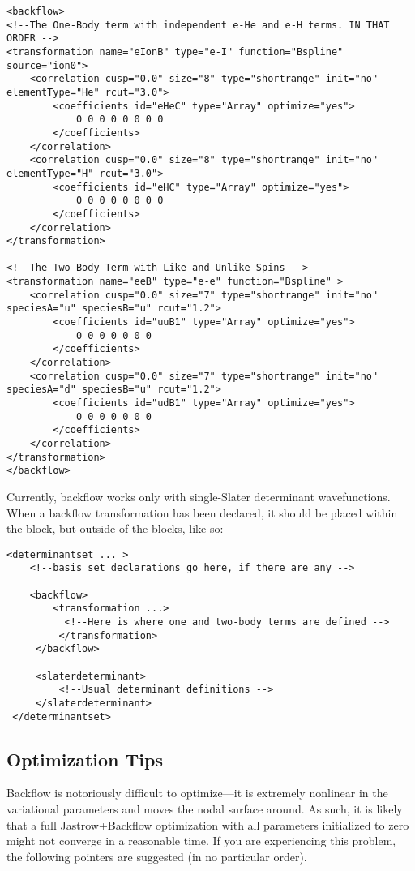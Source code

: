 \begin{lstlisting}[style=QMCPXML]
<backflow>
<!--The One-Body term with independent e-He and e-H terms. IN THAT ORDER -->
<transformation name="eIonB" type="e-I" function="Bspline" source="ion0">
    <correlation cusp="0.0" size="8" type="shortrange" init="no" elementType="He" rcut="3.0">
        <coefficients id="eHeC" type="Array" optimize="yes"> 
            0 0 0 0 0 0 0 0
        </coefficients>
    </correlation>
    <correlation cusp="0.0" size="8" type="shortrange" init="no" elementType="H" rcut="3.0">
        <coefficients id="eHC" type="Array" optimize="yes"> 
            0 0 0 0 0 0 0 0
        </coefficients>
    </correlation>
</transformation>

<!--The Two-Body Term with Like and Unlike Spins -->
<transformation name="eeB" type="e-e" function="Bspline" >
    <correlation cusp="0.0" size="7" type="shortrange" init="no" speciesA="u" speciesB="u" rcut="1.2">
        <coefficients id="uuB1" type="Array" optimize="yes"> 
            0 0 0 0 0 0 0
        </coefficients>
    </correlation>
    <correlation cusp="0.0" size="7" type="shortrange" init="no" speciesA="d" speciesB="u" rcut="1.2">
        <coefficients id="udB1" type="Array" optimize="yes"> 
            0 0 0 0 0 0 0
        </coefficients>
    </correlation>
</transformation>
</backflow>
\end{lstlisting}  

Currently, backflow works only with single-Slater determinant wavefunctions.  When a backflow transformation has been declared, it should be placed within the  block, but outside of the  blocks, like so:

\begin{lstlisting}[style=QMCPXML]
<determinantset ... >
    <!--basis set declarations go here, if there are any -->
    
    <backflow>
        <transformation ...>
          <!--Here is where one and two-body terms are defined -->
         </transformation>
     </backflow>
     
     <slaterdeterminant>
         <!--Usual determinant definitions -->
     </slaterdeterminant>
 </determinantset>
\end{lstlisting}

\subsection{Optimization Tips}
Backflow is notoriously difficult to optimize---it is extremely nonlinear in the variational parameters and moves the nodal surface around.  As such, it is likely that a full Jastrow+Backflow optimization with all parameters initialized to zero might not converge in a reasonable time.  If you are experiencing this problem, the following pointers are suggested (in no particular order).

